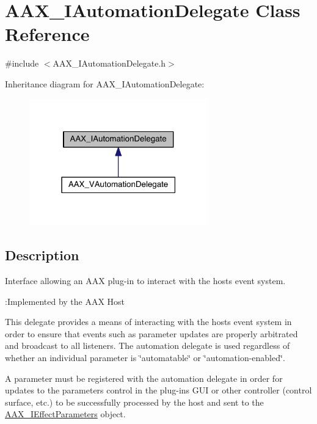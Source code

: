 \hypertarget{a00086}{}\section{A\+A\+X\+\_\+\+I\+Automation\+Delegate Class Reference}
\label{a00086}


{\ttfamily \#include $<$A\+A\+X\+\_\+\+I\+Automation\+Delegate.\+h$>$}



Inheritance diagram for A\+A\+X\+\_\+\+I\+Automation\+Delegate\+:
\nopagebreak
\begin{figure}[H]
\begin{center}
\leavevmode
\includegraphics[width=219pt]{a00601}
\end{center}
\end{figure}


\subsection{Description}
Interface allowing an A\+A\+X plug-\/in to interact with the host\textquotesingle{}s event system. 

\begin{DoxyRefDesc}{\+:\+Implemented by the A\+A\+X Host}
\item[\hyperlink{a00001__aax_host_implementation000001}{\+:\+Implemented by the A\+A\+X Host}]\end{DoxyRefDesc}


This delegate provides a means of interacting with the host\textquotesingle{}s event system in order to ensure that events such as parameter updates are properly arbitrated and broadcast to all listeners. The automation delegate is used regardless of whether an individual parameter is \char`\"{}automatable\char`\"{} or \char`\"{}automation-\/enabled\char`\"{}.

A parameter must be registered with the automation delegate in order for updates to the parameter\textquotesingle{}s control in the plug-\/in\textquotesingle{}s G\+U\+I or other controller (control surface, etc.) to be successfully processed by the host and sent to the \hyperlink{a00099}{A\+A\+X\+\_\+\+I\+Effect\+Parameters} object.

